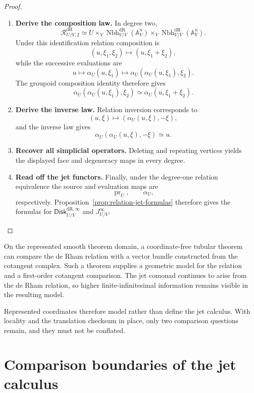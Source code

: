 \begin{proof}
\begin{enumerate}[label=\textup{(\arabic*)}]
    \item \textbf{Derive the composition law.}
In degree two,
\[
  \mathcal R^{\mathrm{dR}}_{U/V,2}
  \simeq
  U\times_V\operatorname{Nbh}^{\mathrm{dR}}_{V/V}(\mathbb A^n_V)\times_V\operatorname{Nbh}^{\mathrm{dR}}_{V/V}(\mathbb A^n_V).
\]
Under this identification relation composition is
\[
  (u,\xi_1,\xi_2)
  \longmapsto
  (u,\xi_1+\xi_2),
\]
while the successive evaluations are
\[
  u
  \longmapsto
  \alpha_U(u,\xi_1)
  \longmapsto
  \alpha_U(\alpha_U(u,\xi_1),\xi_2).
\]
The groupoid composition identity therefore gives
\[
  \alpha_U(\alpha_U(u,\xi_1),\xi_2)
  \simeq
  \alpha_U(u,\xi_1+\xi_2).
\]

    \item \textbf{Derive the inverse law.}
Relation inversion corresponds to
\[
  (u,\xi)
  \longmapsto
  (\alpha_U(u,\xi),-\xi),
\]
and the inverse law gives
\[
  \alpha_U(\alpha_U(u,\xi),-\xi)\simeq u.
\]

    \item \textbf{Recover all simplicial operators.}
Deleting and repeating vertices yields the displayed face and degeneracy maps
in every degree.

    \item \textbf{Read off the jet functors.}
Finally, under the degree-one relation equivalence the source and evaluation
maps are
\[
  \operatorname{pr}_U,
  \qquad
  \alpha_U,
\]
respectively. Proposition~\ref{prop:relation-jet-formulas} therefore gives
the formulas for \(\mathsf{Disk}^{\mathrm{dR},\infty}_{U/V}\) and \(J^\infty_{U/V}\).
\end{enumerate}
\end{proof}

\begin{remark}
On the represented smooth theorem domain, a coordinate-free tubular theorem
can compare the de Rham relation with a vector bundle constructed from the
cotangent complex. Such a theorem supplies a geometric model for the relation
and a first-order cotangent comparison. The jet comonad continues to arise
from the de Rham relation, so higher finite-infinitesimal information remains
visible in the resulting model.
\end{remark}

Represented coordinates therefore model rather than define the jet calculus.
With locality and the translation checksum in place, only two comparison
questions remain, and they must not be conflated.

\section{Comparison boundaries of the jet calculus}
\label{sec:jets-comparison-boundaries}

